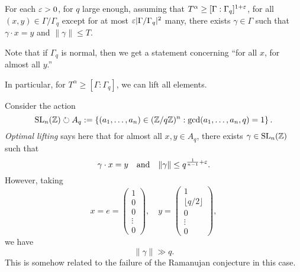 \documentclass[reqno]{amsart} 
\begin{document}
\begin{conjecture}\label{conjecture:cj4460l5mk}
  For each $\varepsilon > 0$, for $q$ large enough, assuming that $T^\alpha \geq [\Gamma : \Gamma_q ]^{1 + \varepsilon}$, for all $(x, y ) \in \Gamma / \Gamma_q $ except for at most $\varepsilon \lvert \Gamma / \Gamma_q  \rvert^2 $ many, there exists $\gamma \in \Gamma $ such that $\gamma \cdot x = y$ and $\lVert \gamma  \rVert \leq T$.
\end{conjecture}
Note that if $\Gamma_q$ is normal, then we get a statement concerning ``for all $x$, for almost all $y$.''

In particular, for $T^\alpha \geq [\Gamma : \Gamma_q ]$, we can lift all elements.

\begin{example}\label{example:cj4460l6xt}
  Consider the action
  \begin{equation*}
    \operatorname{SL}_n (\mathbb{Z}) \circlearrowright A_q := \left\{ (a_1, \dotsc, a_n ) \in (\mathbb{Z} / q \mathbb{Z} )^n  : \gcd (a_1, \dotsc, a_n , q) = 1 \right\}.
  \end{equation*}
  \emph{Optimal lifting} says here that for almost all $x, y \in A_q$, there exists $\gamma \in \operatorname{SL}_n (\mathbb{Z})$ such that
  \begin{equation*}
    \gamma \cdot x = y
    \quad \text{and}
    \quad
    \lVert \gamma \rVert \leq q^{\frac{1}{n - 1} + \varepsilon}.
  \end{equation*}
  However, taking
  \begin{equation*}
    x = e =
    \begin{pmatrix}
      1  \\
      0  \\
      0\\
      \vdots \\
      0
    \end{pmatrix},
    \quad
    y = 
    \begin{pmatrix}
      1  \\
      \lfloor q/2 \rfloor  \\
      0\\
      \vdots \\
      0
    \end{pmatrix},
  \end{equation*}
  we have
  \begin{equation*}
    \lVert \gamma  \rVert \gg q.
  \end{equation*}
  This is somehow related to the failure of the Ramanujan conjecture in this case.
\end{example}
\end{document}
